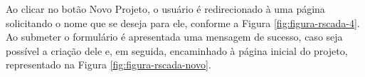     	\begin{figure}[!h]
    	\end{figure}
    	
Ao clicar no botão Novo Projeto, o usuário é redirecionado à uma página solicitando o nome que se deseja para ele, conforme a Figura \ref{fig:figura-rscada-4}. Ao submeter o formulário é apresentada uma mensagem de sucesso, caso seja possível a criação dele e, em seguida, encaminhado à página inicial do projeto, representado na Figura \ref{fig:figura-rscada-novo}. 

        \begin{figure}[!h]
    	\end{figure}
    	
    	\begin{figure}[!h]
    	\end{figure}

